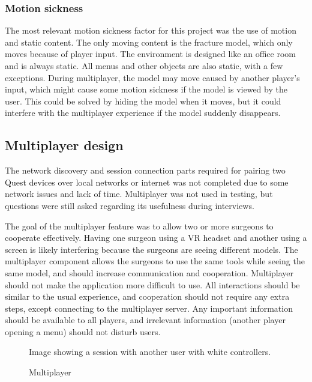 \documentclass[a4paper]{report}
\begin{document}
\subsubsection{Motion sickness}
The most relevant motion sickness factor for this project was the use of motion and static content. The only moving content is the fracture model, which only moves because of player input. The environment is designed like an office room and is always static. All menus and other objects are also static, with a few exceptions.
During multiplayer, the model may move caused by another player's input, which might cause some motion sickness if the model is viewed by the user. This could be solved by hiding the model when it moves, but it could interfere with the multiplayer experience if the model suddenly disappears.

\subsection{Multiplayer design}
The network discovery and session connection parts required for pairing two Quest devices over local networks or internet was not completed due to some network issues and lack of time. Multiplayer was not used in testing, but questions were still asked regarding its usefulness during interviews.

The goal of the multiplayer feature was to allow two or more surgeons to cooperate effectively. Having one surgeon using a VR headset and another using a screen is likely interfering because the surgeons are seeing different models. The multiplayer component allows the surgeons to use the same tools while seeing the same model, and should increase communication and cooperation.
Multiplayer should not make the application more difficult to use. All interactions should be similar to the usual experience, and cooperation should not require any extra steps, except connecting to the multiplayer server. Any important information should be available to all players, and irrelevant information (another player opening a menu) should not disturb users.

\begin{figure}[h!]
    \centering
	\hfill
	\caption{Multiplayer}\label{multiplayer}
  \small
  Image showing a session with another user with white controllers.
\end{figure}
\end{document}
